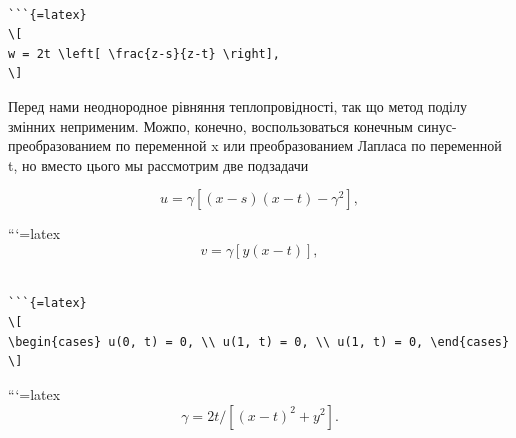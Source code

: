 \documentclass[
]{article}
\begin{document}
\begin{verbatim}

```{=latex}
\[
w = 2t \left[ \frac{z-s}{z-t} \right],
\]
\end{verbatim}

Перед нами неоднородное рівняння теплопровідності, так що метод поділу
змінних неприменим. Можпо, конечно, воспользоваться конечным
синус-преобразованием по переменной x или преобразованием Лапласа по
переменной t, но вместо цього мы рассмотрим две подзадачи

\[
u = \gamma [(x-s)(x-t)-\gamma^2],
\]

```{=latex}
\[
v = \gamma [y(x-t)],
\]

\begin{verbatim}

```{=latex}
\[
\begin{cases} u(0, t) = 0, \\ u(1, t) = 0, \\ u(1, t) = 0, \end{cases}
\]
\end{verbatim}

```{=latex}
\[
\gamma = 2t/[(x-t)^2 + y^2].
\]
\end{document}
